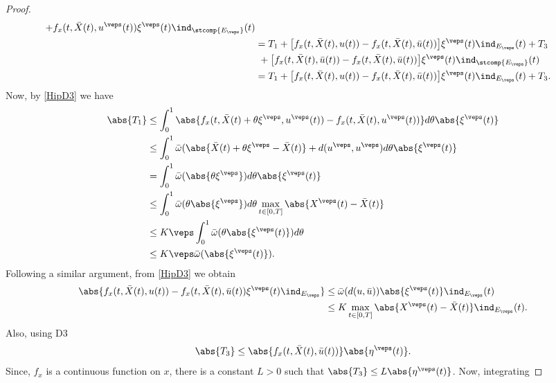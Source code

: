 \begin{proof}
\begin{align*}
            + f_x(t, \Bar{X}(t), u^{\veps}(t))\xi^{\veps}(t)\ind_{\stcomp{E_{\veps}}}(t) \\
        &=  T_1 + \big[f_x(t,\Bar{X}(t), u(t)) - f_x(t,\Bar{X}(t),\Bar{u}(t))\big]
            \xi^{\veps}(t)\ind_{E_{\veps}}(t) + T_3 \\
            &\,\, + \big[f_x(t, \Bar{X}(t),\Bar{u}(t)) - f_x(t,\Bar{X}(t),\Bar{u}(t))\big]
            \xi^{\veps}(t)\ind_{\stcomp{E_{\veps}}}(t) \\
        &= T_1 + \big[f_x(t,\Bar{X}(t), u(t)) - f_x(t,\Bar{X}(t),\Bar{u}(t))\big] %
            \xi^{\veps}(t)\ind_{E_{\veps}}(t) + T_3.
    \end{align*}
    Now, by \cref{HipD3} we have 
    \begin{align*}
        \abs{T_1} &\leq 
            \int_{0}^{1}\abs{f_x(t,\Bar{X}(t)+\theta \xi^{\veps},u^{\veps}(t))
            - f_{x}(t,\Bar{X}(t), u^{\veps}(t))}d\theta \abs{\xi^{\veps}(t)} \\
        &\leq \int_{0}^{1} \Bar{\omega}(\abs{\Bar{X}(t)+\theta \xi^{\veps} - \Bar{X}(t)} 
            + d(u^{\veps},u^{\veps})d\theta \abs{\xi^{\veps}(t)} \\
        &=   \int_{0}^{1} \Bar{\omega}(\abs{\theta \xi^{\veps}})d\theta \abs{\xi^{\veps}(t)} \\
        &\leq \int_{0}^{1}\Bar{\omega}(\theta \abs{\xi^{\veps}} )d\theta
            \max_{t\in[0,T]}\abs{X^{\veps}(t) - \Bar{X}(t)} \\
        &\leq K\veps \int_{0}^{1} \Bar{\omega}(\theta \abs{\xi^{\veps}(t)}) d\theta  \\
        &\leq K\veps \Bar{\omega}(\abs{\xi^{\veps}(t)}) .
    \end{align*}
    Following a similar argument, from \cref{HipD3} we obtain 
    \begin{align*}
        \abs{f_x(t,\Bar{X}(t), u(t)) - f_x(t,\Bar{X}(t),\Bar{u}(t))\xi^{\veps}(t)\ind_{E_{\veps}}}
            &\leq \Bar{\omega}(d(u, \Bar{u}))\abs{\xi^{\veps}(t)}\ind_{E_{\veps}}(t)\\
            &\leq K \max_{t\in [0,T]} \abs{X^{\veps}(t) - \Bar{X}(t)}\ind_{E_{\veps}}(t) .
    \end{align*}
    Also, using D3
    \begin{equation*}
        \abs{T_3} \leq \abs{f_x(t, \Bar{X}(t), \Bar{u}(t))}\abs{\eta ^{\veps}(t)}.
    \end{equation*}
    Since, $f_x$ is a continuous function on $x$, there is a constant $L>0$ such
    that $ \abs{T_3} \leq L \abs{\eta ^{\veps}(t)}$. Now, integrating

\end{proof}
